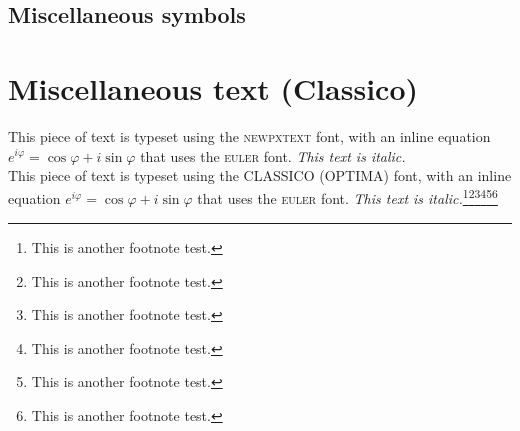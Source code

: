 \documentclass[b5paper,twoside,openright]{scrbook}
\begin{document}
\subsection{Miscellaneous symbols}

\section{Miscellaneous text (Classico)}
This piece of text is typeset using the \textsc{newpxtext} font, with an inline equation $e^{i\varphi} = \cos\varphi + i\sin\varphi$ that uses the \textsc{euler} font. \emph{This text is italic.}\\[1ex]
\textsf{This piece of text is typeset using the CLASSICO (OPTIMA) font, with an inline equation $e^{i\varphi} = \cos\varphi + i\sin\varphi$ that uses the \textsc{euler} font. \textit{This text is italic.}}\footnote{This is another footnote test.}\footnote{This is another footnote test.}\footnote{This is another footnote test.}\footnote{This is another footnote test.}\footnote{This is another footnote test.}\footnote{This is another footnote test.}
\end{document}
